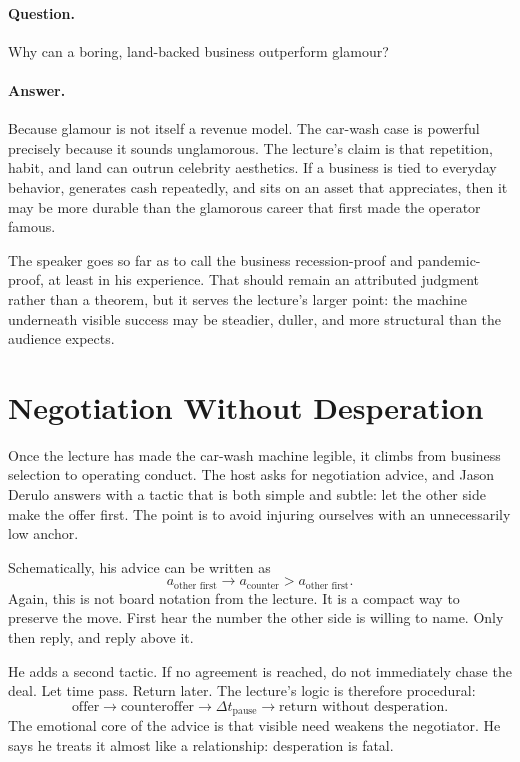 \paragraph{Question.}
Why can a boring, land-backed business outperform glamour?

\paragraph{Answer.}
Because glamour is not itself a revenue model. The car-wash case is powerful precisely because it sounds unglamorous. The lecture's claim is that repetition, habit, and land can outrun celebrity aesthetics. If a business is tied to everyday behavior, generates cash repeatedly, and sits on an asset that appreciates, then it may be more durable than the glamorous career that first made the operator famous.

The speaker goes so far as to call the business recession-proof and pandemic-proof, at least in his experience. That should remain an attributed judgment rather than a theorem, but it serves the lecture's larger point: the machine underneath visible success may be steadier, duller, and more structural than the audience expects.

\section{Negotiation Without Desperation}

Once the lecture has made the car-wash machine legible, it climbs from business selection to operating conduct. The host asks for negotiation advice, and Jason Derulo answers with a tactic that is both simple and subtle: let the other side make the offer first. The point is to avoid injuring ourselves with an unnecessarily low anchor.

Schematically, his advice can be written as
\begin{equation}
a_{\text{other first}}
\to
a_{\text{counter}} > a_{\text{other first}}.
\end{equation}
Again, this is not board notation from the lecture. It is a compact way to preserve the move. First hear the number the other side is willing to name. Only then reply, and reply above it.

He adds a second tactic. If no agreement is reached, do not immediately chase the deal. Let time pass. Return later. The lecture's logic is therefore procedural:
\begin{equation}
\text{offer}\to \text{counteroffer}\to \Delta t_{\text{pause}}\to \text{return without desperation}.
\end{equation}
The emotional core of the advice is that visible need weakens the negotiator. He says he treats it almost like a relationship: desperation is fatal.


